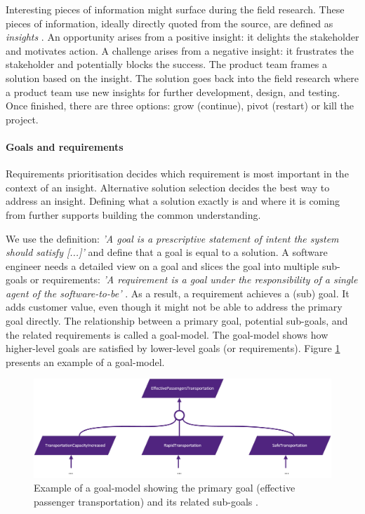 Interesting pieces of information might surface during the field research. These pieces of information, ideally directly quoted from the source, are defined as \emph{insights} \parencite{OTH02}. An opportunity arises from a positive insight: it delights the stakeholder and motivates action. A challenge arises from a negative insight: it frustrates the stakeholder and potentially blocks the success. The product team frames a solution based on the insight. The solution goes back into the field research where a product team use new insights for further development, design, and testing. Once finished, there are three options: grow (continue), pivot (restart) or kill the project.

\paragraph{Goals and requirements} \label{gr}
Requirements prioritisation decides which requirement is most important in the context of an insight. Alternative solution selection decides the best way to address an insight. Defining what a solution exactly is and where it is coming from further supports building the common understanding.

We use the definition: \textit{'A goal is a prescriptive statement of intent the system should satisfy [...]'} \parencite{BK04} and define that a goal is equal to a solution. A software engineer needs a detailed view on a goal and slices the goal into multiple sub-goals or requirements: \textit{'A requirement is a goal under the responsibility of a single agent of the software-to-be'} \parencite{BK04}. As a result, a requirement achieves a (sub) goal. It adds customer value, even though it might not be able to address the primary goal directly. The relationship between a primary goal, potential sub-goals, and the related requirements is called a goal-model. The goal-model shows how higher-level goals are satisfied by lower-level goals (or requirements). Figure \ref{fig:gm} presents an example of a goal-model.

\begin{figure}[H]
\centering
  \includegraphics[width=15cm]{../../Images/GoalModel.png}
  \caption{Example of a goal-model showing the primary goal (effective passenger transportation) and its related sub-goals \parencite{BK04}.}
  \label{fig:gm}
\end{figure}

